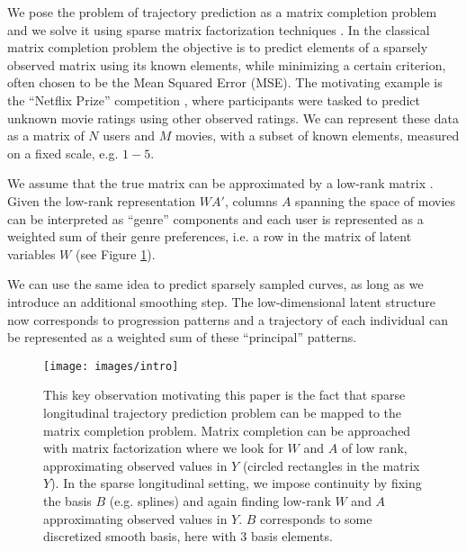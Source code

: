 \documentclass[preprint]{imsart}
\numberwithin{equation}{section}
\theoremstyle{plain}
\begin{document}
We pose the problem of trajectory prediction as a matrix completion problem and we solve it using sparse matrix factorization techniques \citep{rennie2005fast, candes2009exact}. In the classical matrix completion problem the objective is to predict elements of a sparsely observed matrix using its known elements, while minimizing a certain criterion, often chosen to be the Mean Squared Error (MSE). The motivating example is the ``Netflix Prize'' competition \citep{bennett2007netflix}, where participants were tasked to predict unknown movie ratings using other observed ratings. We can represent these data as a matrix of $N$ users and $M$ movies, with a subset of known elements, measured on a fixed scale, e.g. $1-5$.

We assume that the true matrix can be approximated by a low-rank matrix \citep{srebro2005generalization}. Given the low-rank representation $WA'$, columns $A$ spanning the space of movies can be interpreted as ``genre'' components and each user is represented as a weighted sum of their genre preferences, i.e. a row in the matrix of latent variables $W$ (see Figure \ref{fig:idea}).

We can use the same idea to predict sparsely sampled curves, as long as we introduce an additional smoothing step. The low-dimensional latent structure now corresponds to progression patterns and a trajectory of each individual can be represented as a weighted sum of these ``principal'' patterns.


\begin{figure}[h]
  \texttt{[image: images/intro]}
  \caption{This key observation motivating this paper is the fact that sparse longitudinal trajectory prediction problem can be mapped to the matrix completion problem. Matrix completion can be approached with matrix factorization where we look for $W$ and $A$ of low rank, approximating observed values in $Y$ (circled rectangles in the matrix $Y$). In the sparse longitudinal setting, we impose continuity by fixing the basis $B$ (e.g. splines) and again finding low-rank $W$ and $A$ approximating observed values in $Y$. $B$ corresponds to some discretized smooth basis, here with $3$ basis elements.}
  \label{fig:idea}
\end{figure}
\end{document}
